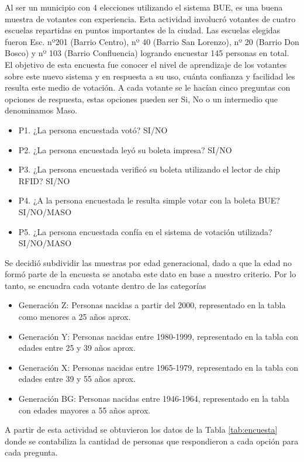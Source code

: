 Al ser un municipio con 4 elecciones utilizando el sistema BUE, es una buena muestra de votantes con experiencia. Esta actividad involucró votantes de cuatro escuelas repartidas en puntos importantes de la ciudad. Las escuelas elegidas fueron Esc. nº201 (Barrio Centro), nº 40 (Barrio San Lorenzo), nº 20 (Barrio Don Bosco) y nº 103 (Barrio Confluencia) logrando encuestar 145 personas en total. \newline
El objetivo de esta encuesta fue conocer el nivel de aprendizaje de los votantes sobre este nuevo sistema y en respuesta a su uso, cuánta confianza y facilidad les resulta este medio de votación. A cada votante se le hacían cinco preguntas con opciones de respuesta, estas opciones pueden ser Si, No o un intermedio que denominamos Maso.
\begin{itemize}
    \item P1. ¿La persona encuestada votó? SI/NO
    \item P2. ¿La persona encuestada leyó su boleta impresa? SI/NO
    \item P3. ¿La persona encuestada verificó su boleta utilizando el lector de chip RFID? SI/NO
    \item P4. ¿A la persona encuestada le resulta simple votar con la boleta BUE? SI/NO/MASO
    \item P5. ¿La persona encuestada confía en el sistema de votación utilizada? SI/NO/MASO
\end{itemize}

Se decidió subdividir las muestras por edad generacional, dado a que la edad no formó parte de la encuesta se anotaba este dato en base a nuestro criterio. Por lo tanto, se encuadra cada votante dentro de las categorías
\begin{itemize}
    \item Generación Z: Personas nacidas a partir del 2000, representado en la tabla como menores a 25 años aprox.
    \item Generación Y: Personas nacidas entre 1980-1999, representado en la tabla con edades entre 25 y 39 años aprox.
    \item Generación X: Personas nacidas entre 1965-1979, representado en la tabla con edades entre 39 y 55 años aprox.
    \item Generación BG: Personas nacidas entre 1946-1964, representado en la tabla con edades mayores a 55 años aprox.
\end{itemize}
A partir de esta actividad se obtuvieron los datos de la Tabla \ref{tab:encuesta} donde se contabiliza la cantidad de personas que respondieron a cada opción para cada pregunta.

